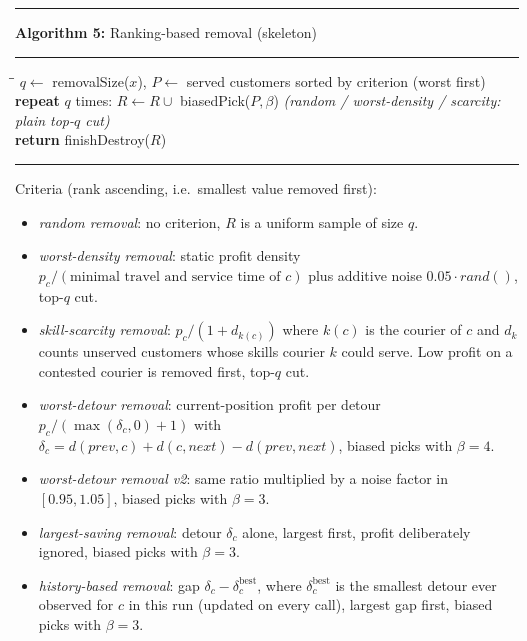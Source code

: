 \documentclass[10pt, a4paper]{article}
\begin{document}
\begin{center}
\begin{minipage}{0.92\linewidth}
\small
\hrule\vspace{2pt}
\textbf{Algorithm 5:} Ranking-based removal (skeleton)
\vspace{2pt}\hrule\vspace{4pt}
\begin{tabbing}
\hspace{1.2em}\=\hspace{1.2em}\=\kill
$q \leftarrow$ removalSize($x$),\quad
$P \leftarrow$ served customers sorted by criterion (worst first)\\
\textbf{repeat} $q$ times: $R \leftarrow R \cup{}$ biasedPick($P, \beta$)
\quad\emph{(random / worst-density / scarcity: plain top-$q$ cut)}\\
\textbf{return} finishDestroy($R$)
\end{tabbing}
\vspace{2pt}\hrule
\end{minipage}
\end{center}

\noindent Criteria (rank ascending, i.e.\ smallest value removed first):
\begin{itemize}\itemsep1pt
\item \emph{random removal}: no criterion, $R$ is a uniform sample of size
  $q$.
\item \emph{worst-density removal}: static profit density
  $p_c / (\text{minimal travel and service time of } c)$ plus additive
  noise $0.05 \cdot \mathit{rand}()$, top-$q$ cut.
\item \emph{skill-scarcity removal}: $p_c / (1 + d_{k(c)})$ where $k(c)$ is
  the courier of $c$ and $d_k$ counts unserved customers whose skills
  courier $k$ could serve. Low profit on a contested courier is removed
  first, top-$q$ cut.
\item \emph{worst-detour removal}: current-position profit per detour
  $p_c / (\max(\delta_c, 0) + 1)$ with
  $\delta_c = d(\mathit{prev}, c) + d(c, \mathit{next}) -
  d(\mathit{prev}, \mathit{next})$, biased picks with $\beta = 4$.
\item \emph{worst-detour removal v2}: same ratio multiplied by a noise
  factor in $[0.95, 1.05]$, biased picks with $\beta = 3$.
\item \emph{largest-saving removal}: detour $\delta_c$ alone, largest
  first, profit deliberately ignored, biased picks with $\beta = 3$.
\item \emph{history-based removal}: gap $\delta_c -
  \delta_c^{\text{best}}$, where $\delta_c^{\text{best}}$ is the smallest
  detour ever observed for $c$ in this run (updated on every call),
  largest gap first, biased picks with $\beta = 3$.
\end{itemize}
\end{document}
